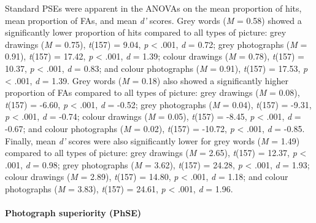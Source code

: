 \documentclass[
  11pt,
]{article}
\begin{document}
Standard PSEs were apparent in the ANOVAs on the mean proportion of
hits, mean proportion of FAs, and mean \emph{d'} scores. Grey words
(\emph{M} = 0.58) showed a significantly lower proportion of hits
compared to all types of picture: grey drawings (\emph{M} = 0.75),
\emph{t}(157) = 9.04, \emph{p} \textless{} .001, \emph{d} = 0.72; grey
photographs (\emph{M} = 0.91), \emph{t}(157) = 17.42, \emph{p}
\textless{} .001, \emph{d} = 1.39; colour drawings (\emph{M} = 0.78),
\emph{t}(157) = 10.37, \emph{p} \textless{} .001, \emph{d} = 0.83; and
colour photographs (\emph{M} = 0.91), \emph{t}(157) = 17.53, \emph{p}
\textless{} .001, \emph{d} = 1.39. Grey words (\emph{M} = 0.18) also
showed a significantly higher proportion of FAs compared to all types of
picture: grey drawings (\emph{M} = 0.08), \emph{t}(157) = -6.60,
\emph{p} \textless{} .001, \emph{d} = -0.52; grey photographs (\emph{M}
= 0.04), \emph{t}(157) = -9.31, \emph{p} \textless{} .001, \emph{d} =
-0.74; colour drawings (\emph{M} = 0.05), \emph{t}(157) = -8.45,
\emph{p} \textless{} .001, \emph{d} = -0.67; and colour photographs
(\emph{M} = 0.02), \emph{t}(157) = -10.72, \emph{p} \textless{} .001,
\emph{d} = -0.85. Finally, mean \emph{d'} scores were also significantly
lower for grey words (\emph{M} = 1.49) compared to all types of picture:
grey drawings (\emph{M} = 2.65), \emph{t}(157) = 12.37, \emph{p}
\textless{} .001, \emph{d} = 0.98; grey photographs (\emph{M} = 3.62),
\emph{t}(157) = 24.28, \emph{p} \textless{} .001, \emph{d} = 1.93;
colour drawings (\emph{M} = 2.89), \emph{t}(157) = 14.80, \emph{p}
\textless{} .001, \emph{d} = 1.18; and colour photographs (\emph{M} =
3.83), \emph{t}(157) = 24.61, \emph{p} \textless{} .001, \emph{d} =
1.96.

\newpage

\hypertarget{photograph-superiority-phse}{%
\paragraph{Photograph superiority
(PhSE)}\label{photograph-superiority-phse}}
\end{document}
